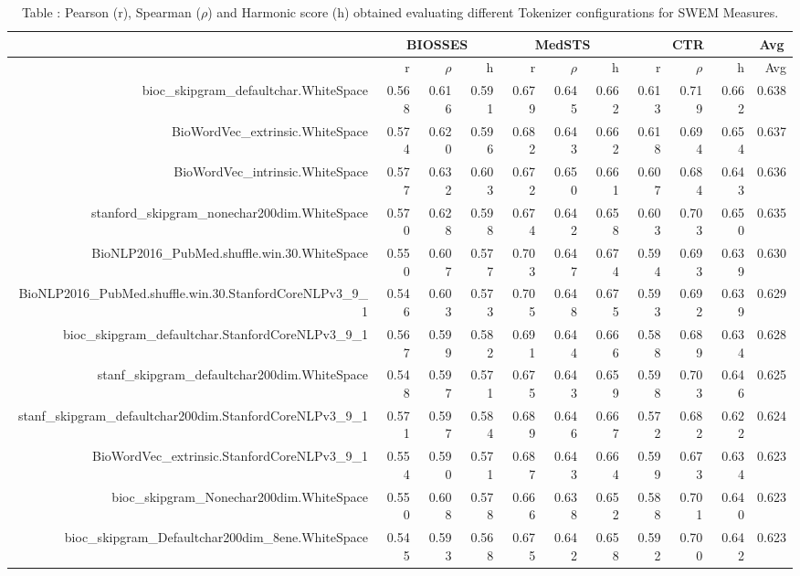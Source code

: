 \begin{table}[!h]
\centering
\caption{Table \label{table:Preprocessing_tokenizers_SWEMMeasures}: Pearson (r), Spearman ($\rho$) and Harmonic score (h) obtained evaluating different Tokenizer configurations for SWEM Measures.} 
\begingroup\tiny
\begin{tabular}{rrrrrrrrrrr}
  \hline \multicolumn{1}{c}{ } & \multicolumn{3}{c}{BIOSSES} & \multicolumn{3}{c}{MedSTS} & \multicolumn{3}{c}{CTR} & \multicolumn{1}{c}{Avg} \\  \hline
 & r & $\rho$ & h & r & $\rho$ & h & r & $\rho$ & h & Avg \\ 
  \hline
bioc\_skipgram\_defaultchar.WhiteSpace & 0.568 & 0.616 & 0.591 & 0.679 & 0.645 & 0.662 & 0.613 & 0.719 & 0.662 & 0.638 \\ 
  BioWordVec\_extrinsic.WhiteSpace & 0.574 & 0.620 & 0.596 & 0.682 & 0.643 & 0.662 & 0.618 & 0.694 & 0.654 & 0.637 \\ 
  BioWordVec\_intrinsic.WhiteSpace & 0.577 & 0.632 & 0.603 & 0.672 & 0.650 & 0.661 & 0.607 & 0.684 & 0.643 & 0.636 \\ 
  stanford\_skipgram\_nonechar200dim.WhiteSpace & 0.570 & 0.628 & 0.598 & 0.674 & 0.642 & 0.658 & 0.603 & 0.703 & 0.650 & 0.635 \\ 
  BioNLP2016\_PubMed.shuffle.win.30.WhiteSpace & 0.550 & 0.607 & 0.577 & 0.703 & 0.647 & 0.674 & 0.594 & 0.693 & 0.639 & 0.630 \\ 
  BioNLP2016\_PubMed.shuffle.win.30.StanfordCoreNLPv3\_9\_1 & 0.546 & 0.603 & 0.573 & 0.705 & 0.648 & 0.675 & 0.593 & 0.692 & 0.639 & 0.629 \\ 
  bioc\_skipgram\_defaultchar.StanfordCoreNLPv3\_9\_1 & 0.567 & 0.599 & 0.582 & 0.691 & 0.644 & 0.666 & 0.588 & 0.689 & 0.634 & 0.628 \\ 
  stanf\_skipgram\_defaultchar200dim.WhiteSpace & 0.548 & 0.597 & 0.571 & 0.675 & 0.643 & 0.659 & 0.598 & 0.703 & 0.646 & 0.625 \\ 
  stanf\_skipgram\_defaultchar200dim.StanfordCoreNLPv3\_9\_1 & 0.571 & 0.597 & 0.584 & 0.689 & 0.646 & 0.667 & 0.572 & 0.682 & 0.622 & 0.624 \\ 
  BioWordVec\_extrinsic.StanfordCoreNLPv3\_9\_1 & 0.554 & 0.590 & 0.571 & 0.687 & 0.643 & 0.664 & 0.599 & 0.673 & 0.634 & 0.623 \\ 
  bioc\_skipgram\_Nonechar200dim.WhiteSpace & 0.550 & 0.608 & 0.578 & 0.666 & 0.638 & 0.652 & 0.588 & 0.701 & 0.640 & 0.623 \\ 
  bioc\_skipgram\_Defaultchar200dim\_8ene.WhiteSpace & 0.545 & 0.593 & 0.568 & 0.675 & 0.642 & 0.658 & 0.592 & 0.700 & 0.642 & 0.623 \\ 

\end{tabular}
\end{table}
